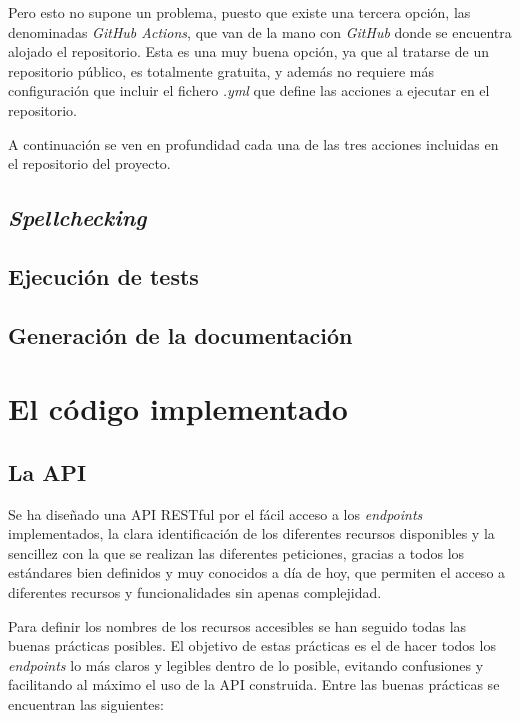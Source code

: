 Pero esto no supone un problema, puesto que existe una tercera opción, las denominadas \textit{GitHub Actions}, que van de la mano con \textit{GitHub} donde se encuentra alojado el repositorio. Esta es una muy buena opción, ya que al tratarse de un repositorio público, es totalmente gratuita, y además no requiere más configuración que incluir el fichero \textit{.yml} que define las acciones a ejecutar en el repositorio.

A continuación se ven en profundidad cada una de las tres acciones incluidas en el repositorio del proyecto.

\subsection{\textit{Spellchecking}}

\subsection{Ejecución de tests}

\subsection{Generación de la documentación}


\section{El código implementado}

\subsection{La API}
\label{api}

Se ha diseñado una API RESTful por el fácil acceso a los \textit{endpoints} implementados, la clara identificación de los diferentes recursos disponibles y la sencillez con la que se realizan las diferentes peticiones, gracias a todos los estándares bien definidos y muy conocidos a día de hoy, que permiten el acceso a diferentes recursos y funcionalidades sin apenas complejidad.

Para definir los nombres de los recursos accesibles se han seguido todas las buenas prácticas posibles. El objetivo de estas prácticas es el de hacer todos los \textit{endpoints} lo más claros y legibles dentro de lo posible, evitando confusiones y facilitando al máximo el uso de la API construida. Entre las buenas prácticas se encuentran las siguientes:

